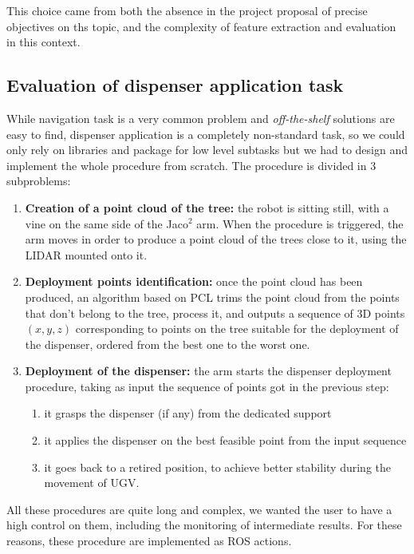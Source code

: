 This choice came from both the absence in the project proposal of precise objectives on ths topic, and the complexity of feature extraction and evaluation in this context.

\subsection{Evaluation of dispenser application task}
 While navigation task is a very common problem and \textit{off-the-shelf} solutions are easy to find, dispenser application is a completely non-standard task, so we could only rely on libraries and package for low level subtasks but we had to design and implement the whole procedure from scratch. The procedure is divided in 3 subproblems:
 \begin{enumerate}
 	\item \textbf{Creation of a point cloud of the tree:} the robot is sitting still, with a vine on the same side of the Jaco$^2$ arm. When the procedure is triggered, the arm moves in order to produce a point cloud of the trees close to it, using the \ac{LIDAR} mounted onto it.
 	\item \textbf{Deployment points identification:} once the point cloud has been produced, an algorithm based on \ac{PCL} trims the point cloud from the points that don't belong to the tree, process it, and outputs a sequence of 3D points $(x,y,z)$ corresponding to points on the tree suitable for the deployment of the dispenser, ordered from the best one to the worst one.
 	\item \textbf{Deployment of the dispenser:} the arm starts the dispenser deployment procedure, taking as input the sequence of points got in the previous step:
 	\begin{enumerate}
 		\item it grasps the dispenser (if any) from the dedicated support
 		\item it applies the dispenser on the best feasible point from the input sequence
 		\item it goes back to a retired position, to achieve better stability during the movement of \ac{UGV}.
 	\end{enumerate}
 \end{enumerate}

All these procedures are quite long and complex, we wanted the user to have a high control on them, including the monitoring of intermediate results. For these reasons, these procedure are implemented as \ac{ROS} actions. 



